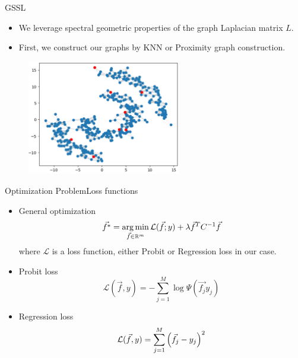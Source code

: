 	\begin{frame}{GSSL}
		\begin{itemize}
			\item We leverage spectral geometric properties of the graph Laplacian matrix $L$.
			\item First, we construct our graphs by KNN or Proximity graph construction.
		\end{itemize}
		\begin{figure}[H]
			\centering
			\hspace*{0cm}\includegraphics[width=0.6\textwidth,height=\textwidth,keepaspectratio]{Figures/SpiKNNRBF.png}
		\end{figure}
	\end{frame}

	\begin{frame}{Optimization Problem}{Loss functions}
		\begin{itemize}
			\item General optimization
			\[\vec{f^*} = \operatorname*{arg\,min}_{\vec{f} \in \mathbb{R}^{m}} \mathcal{L}(\vec{f};y) + \lambda \vec{f}^{T}C^{-1}\vec{f}\]
			where $\mathcal{L}$ is a loss function, either Probit or Regression loss in our case.
			\item Probit loss
			\[
				\mathcal{L}(\vec{f},y) = - \sum_{j=1}^{M}\log \Psi (\vec{f_j}y_j)	
			\]
			\item Regression loss
			\[
				\mathcal{L}(\vec{f},y) = \sum_{j=1}^{M}{\left(\vec{f}_{j} - y_{j}\right)}^2
			\]
		\end{itemize}
	\end{frame}

